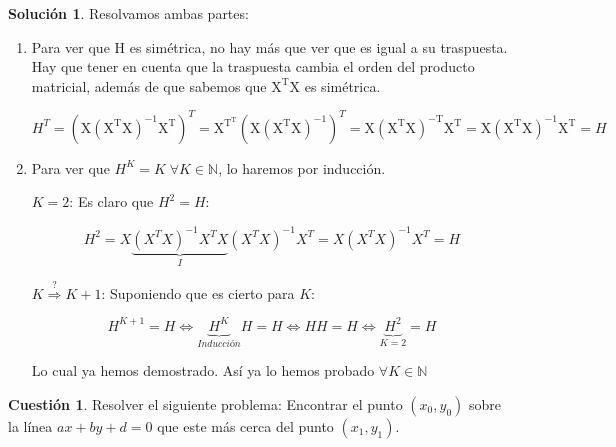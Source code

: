 \documentclass[a4paper, 11pt]{article}
\theoremstyle{definition}
\newtheorem{cuestion}{Cuestión}
\newtheorem*{solucion}{Solución}
\begin{document}
  \begin{solucion}
    Resolvamos ambas partes:
    \begin{enumerate}
      \item Para ver que H es simétrica, no hay más que ver que es igual a su traspuesta. Hay que tener en cuenta que la traspuesta cambia el orden del producto matricial, además de que sabemos que $\mathrm{X^TX}$ es simétrica.

      $$H^T = \left(\mathrm{X(X^TX)^{-1}X^T} \right) ^T = \mathrm{X^{T^T}} \left( \mathrm{X(X^TX)^{-1}}\right)^T = \mathrm{X(X^TX)^{-T}X^T} = \mathrm{X(X^TX)^{-1}X^T} = H$$

      \item Para ver que $H^K = K \; \forall K \in \mathbb{N}$, lo haremos por inducción.

      \underline{$K = 2$}: Es claro que $H^2=H$:

      $$H^2 = X\underbrace{(X^TX)^{-1}X^TX}_{I}(X^TX)^{-1}X^T = X(X^TX)^{-1}X^T = H$$

      \underline{$K \overset{?}{\Rightarrow} K + 1$}: Suponiendo que es cierto para $K$:

      $$H^{K+1} = H \Leftrightarrow \underbrace{H^K}_{Inducción} H = H \Leftrightarrow H H = H \Leftrightarrow \underbrace{H^2}_{K=2}=H$$

      Lo cual ya hemos demostrado. Así ya lo hemos probado $\forall K \in \mathbb{N}$

    \end{enumerate}

  \end{solucion}

  \begin{cuestion}
    Resolver el siguiente problema: Encontrar el punto $(x_0,y_0)$ sobre la línea $ax+by+d=0$ que este más cerca del punto $(x_1,y_1)$.

  \end{cuestion}
\end{document}
